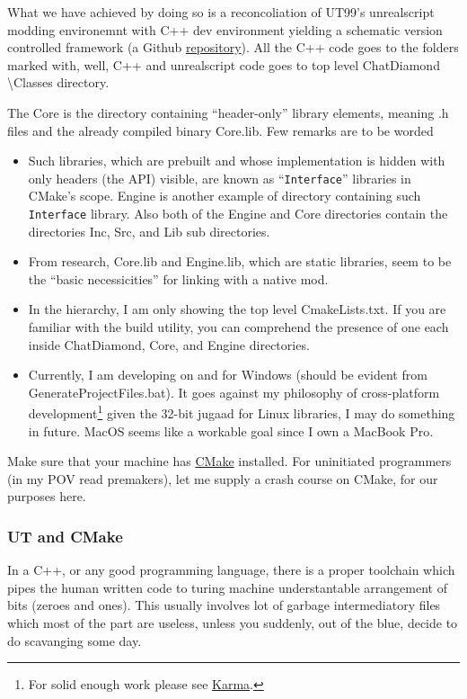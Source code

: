\documentclass{article}
\theoremstyle{definition}
\newcommand{\FileColor}[1]{{\color{Purple} #1}}
\newcommand{\FolderColor}[1]{{\color{mygray} #1}}
\begin{document}
What we have achieved by doing so is a reconcoliation of UT99's unrealscript modding environemnt with C++ dev environment yielding a schematic version controlled framework (a Github 
\href{https://github.com/ravimohan1991/ChatDiamond}{repository}).  
All the C++ code goes to the folders marked with, well, C++ and unrealscript code goes to top level \FolderColor{ChatDiamond \textbackslash Classes} directory.  

The \FolderColor{Core} is the directory containing ``header-only'' library elements, meaning .h files and the already compiled binary \FileColor{Core.lib}.  Few remarks are to be worded
\begin{itemize}
\item Such libraries, which are prebuilt and whose implementation is hidden with only headers (the API) visible, are known as ``\texttt{Interface}'' libraries in CMake's scope.  \FolderColor{Engine} is another example of directory containing such \texttt{Interface} library.  
Also both of the \FolderColor{Engine} and \FolderColor{Core} directories contain the directories \FolderColor{Inc}, \FolderColor{Src}, and \FolderColor{Lib} sub directories. 
\item From research, \FileColor{Core.lib} and \FileColor{Engine.lib}, which are static libraries, seem to be the ``basic necessicities'' for linking with a native mod. 
\item In the hierarchy, I am only showing the top level \FileColor{CmakeLists.txt}.  If you are familiar with the build utility, you can comprehend the presence of one each inside \FolderColor{ChatDiamond}, \FolderColor{Core}, and \FolderColor{Engine} directories.
\item Currently, I am developing on and for Windows (should be evident from \FileColor{GenerateProjectFiles.bat}).  It goes against my philosophy of cross-platform development\footnote{For solid enough work please see \href{https://github.com/ravimohan1991/KarmaEngine}{Karma}.} given the 32-bit jugaad for Linux libraries, I may do something in future.  MacOS seems like a workable goal since I own a MacBook Pro.
\end{itemize}  

Make sure that your machine has \href{https://cmake.org/}{CMake} installed.  For uninitiated programmers (in my POV read premakers), let me
supply a crash course on CMake, for our purposes here.

\subsubsection{UT and CMake}
In a C++, or any good programming language, there is a proper toolchain which pipes the human written code to turing machine understantable arrangement of bits 
(zeroes and ones).  This usually involves lot of garbage intermediatory files which most of the part are useless, unless you suddenly, out of the blue, decide to do 
scavanging some day.
\end{document}
